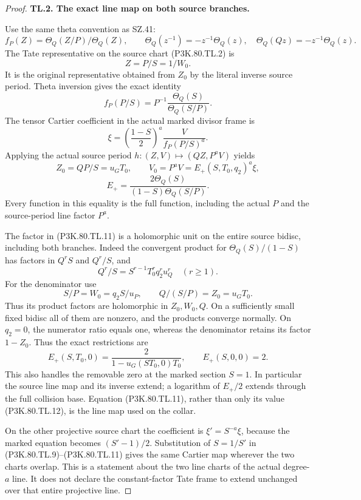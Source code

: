 \begin{proof}
\par\medskip\noindent\textbf{TL.2. The exact line map on both source branches.}\par\nopagebreak[4]

Use the same theta convention as SZ.41:
\[
 f_P(Z)=\Theta_Q(Z/P)/\Theta_Q(Z),\qquad
 \Theta_Q(z^{-1})=-z^{-1}\Theta_Q(z),\quad
 \Theta_Q(Qz)=-z^{-1}\Theta_Q(z).
\]
The Tate representative on the source chart (P3K.80.TL.2) is
\[
                         Z=P/S=1/W_0.                \tag{P3K.80.TL.8}
\]
It is the original representative obtained from \(Z_0\) by the
literal inverse source period. Theta inversion gives the exact
identity
\[
 f_P(P/S)=P^{-1}\frac{\Theta_Q(S)}{\Theta_Q(S/P)}.
\tag{P3K.80.TL.9}
\]
The tensor Cartier coefficient in the actual marked divisor frame
is
\[
       \xi=\left(\frac{1-S}{2}\right)^a
                      \frac{V}{f_P(P/S)^a}.          \tag{P3K.80.TL.10}
\]
Applying the actual source period
\(h:(Z,V)\mapsto(QZ,P^aV)\) yields
\[
 Z_0=QP/S=u_GT_0,\qquad
 V_0=P^aV=E_+(S,T_0,q_2)^a\xi,
\]
\[
 E_+=\frac{2\Theta_Q(S)}{(1-S)\Theta_Q(S/P)}.        \tag{P3K.80.TL.11}
\]
Every function in this equality is the full function, including
the actual \(P\) and the source-period line factor \(P^a\).

The factor in (P3K.80.TL.11) is a holomorphic unit on the entire source
bidisc, including both branches. Indeed the convergent product
for \(\Theta_Q(S)/(1-S)\) has factors in \(Q^rS\) and
\(Q^r/S\), and
\[
 Q^r/S=S^{r-1}T_0^r q_2^r u_Q^r\quad(r\ge1).
\]
For the denominator use
\[
 S/P=W_0=q_2S/u_P,\qquad Q/(S/P)=Z_0=u_GT_0.
\]
Thus its product factors are holomorphic in \(Z_0,W_0,Q\).
On a sufficiently small fixed bidisc all of them are nonzero,
and the products converge normally. On \(q_2=0\), the numerator ratio equals one, whereas the
denominator retains its factor \(1-Z_0\). Thus the exact restrictions
are
\[
 E_+(S,T_0,0)=\frac{2}{1-u_G(ST_0,0)T_0},\qquad
 E_+(S,0,0)=2.                                       \tag{P3K.80.TL.12}
\]
This also handles the removable zero at the marked section
\(S=1\). In particular the source line map and its inverse
extend; a logarithm of \(E_+/2\) extends through the full collision
base. Equation (P3K.80.TL.11), rather than only its value (P3K.80.TL.12), is the
line map used on the collar.

On the other projective source chart the coefficient is
\(\xi'=S^{-a}\xi\), because the marked equation becomes
\((S'-1)/2\). Substitution of \(S=1/S'\) in (P3K.80.TL.9)--(P3K.80.TL.11)
gives the same Cartier map wherever the two charts overlap.
This is a statement about the two line charts of the actual
degree-\(a\) line. It does not declare the constant-factor Tate
frame to extend unchanged over that entire projective line.


\end{proof}
